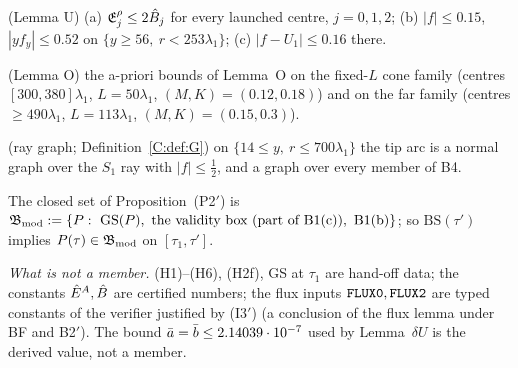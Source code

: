\documentclass[11pt]{article}
\begin{document}
\begin{definition}
\begin{description}[leftmargin=1.3em,itemsep=2pt]
\item[B3U] (Lemma U) (a) $\mathfrak E^\rho_j\le2\hat B_j$ for every launched centre, $j=0,1,2$; (b) $|f|\le0.15$, $|yf_y|\le0.52$ on $\{y\ge56,\ r<253\lambda_1\}$; (c) $|f-U_1|\le0.16$ there.
\item[B4] (Lemma O) the a-priori bounds of Lemma~O on the fixed-$L$ cone family (centres $[300,380]\lambda_1$, $L=50\lambda_1$, $(M,K)=(0.12,0.18)$) and on the far family (centres $\ge490\lambda_1$, $L=113\lambda_1$, $(M,K)=(0.15,0.3)$).
\item[G] (ray graph;  Definition~\ref{C:def:G}) on $\{14\le y,\ r\le700\lambda_1\}$ the tip arc is a normal graph over the $S_1$ ray with $|f|\le\frac12$, and a graph over every member of B4.
\end{description}
The closed set of Proposition~(P2$'$) is $\mathfrak B_{\rm mod}:=\{P:\ \mathrm{GS}(P),\ \text{the validity box (part of B1(c))},\ \text{B1(b)}\}$; so $\mathrm{BS}(\tau')$ implies $P(\tau)\in\mathfrak B_{\rm mod}$ on $[\tau_1,\tau']$.
\end{definition}
\noindent\emph{What is not a member.} (H1)--(H6), (H2f), GS at $\tau_1$ are hand-off data; the constants $\hat E^A,\hat B$ are certified numbers; the flux inputs $\fn{FLUX0},\fn{FLUX2}$ are typed constants of the verifier justified by (I3$'$) (a conclusion of the flux lemma under BF and B2$'$). The bound $\bar a=\bar b\le2.14039\cdot10^{-7}$ used by Lemma~$\delta U$ is the derived value, not a member.
\end{document}
